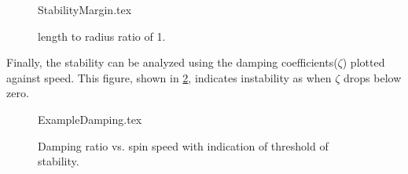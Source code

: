 \begin{figure}
	\def\width{.6*\linewidth}
	\def\height{.4*\linewidth}
	\def\sep{3em}
	\centering
	{StabilityMargin.tex}
	\caption{length to radius ratio of 1.}
	\label{fig:ExampleStabilityMargin}
\end{figure}
Finally, the stability can be analyzed using the damping coefficients($ \zeta $) plotted against speed. This figure, shown in \ref{fig:ExampleDamping}, indicates instability as when $ \zeta $ drops below zero.
\begin{figure}[!htb]
	\def\width{.7*\linewidth}
	\def\height{.4*\linewidth}
	\def\sep{3em}
	\centering
	{ExampleDamping.tex}
	\caption{Damping ratio vs. spin speed with indication of threshold of stability.}
	\label{fig:ExampleDamping}
\end{figure}
